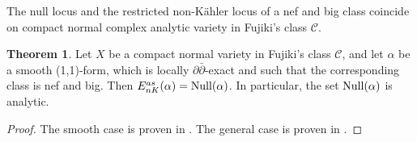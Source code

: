 \documentclass[11pt]{amsart}
\numberwithin{equation}{section}
\theoremstyle{definition}
\theoremstyle{definition}
\newtheorem{theorem}{Theorem}[section]
\theoremstyle{definition}
\begin{document}
The null locus and the restricted non-K\"ahler locus of a nef and big class coincide on compact normal complex analytic variety in Fujiki's class $\mathcal{C}$.


\begin{theorem}\label{t-null} Let $X$ be a compact normal variety in Fujiki's class $\mathcal C$, and let $\alpha$ be a smooth
(1,1)-form, which is locally $\partial\bar\partial$-exact and such that the corresponding class is nef
and big. Then $E^{as}
_{nK} (\alpha ) = {\rm Null}(\alpha )$. In particular, the set ${\rm Null}(\alpha )$ is analytic.
\end{theorem}
\begin{proof} The smooth case is proven in \cite{CT15}.
The general case is proven in \cite[Theorem 4.21]{HP24}.
\end{proof}
\end{document}
